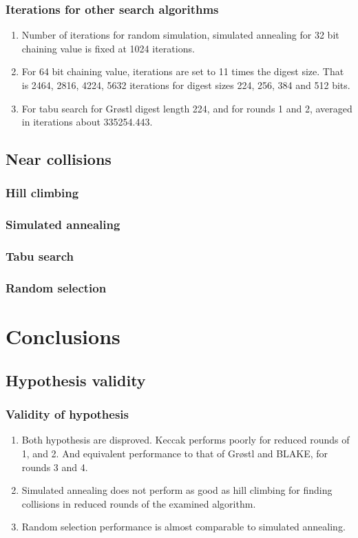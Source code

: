 \documentclass{beamer}
\begin{document}
\begin{frame}
\frametitle{Iterations for other search algorithms}
\begin{enumerate}
\item Number of iterations for random simulation, simulated annealing for 32 bit chaining value is fixed
at 1024 iterations.
\item For 64 bit chaining value, iterations are set to 11 times the digest size. That is 2464, 2816, 4224,
5632 iterations for digest sizes 224, 256, 384 and 512 bits.
\item For tabu search for Gr{\o}stl digest length 224, and for rounds 1 and 2, averaged in iterations 
about 335254.443.
\end{enumerate}
\end{frame}

\subsection{Near collisions}

\begin{frame}
\frametitle{Hill climbing}

\end{frame}

\begin{frame}
\frametitle{Simulated annealing}
\end{frame}

\begin{frame}
\frametitle{Tabu search}
\end{frame}

\begin{frame}
\frametitle{Random selection}
\end{frame}

\section{Conclusions}

\subsection{Hypothesis validity}

\begin{frame}
\frametitle{Validity of hypothesis}
\begin{enumerate}
\item Both hypothesis are disproved. Keccak performs poorly for reduced rounds of 1, and 2. And
equivalent performance to that of Gr{\o}stl and BLAKE, for rounds 3 and 4.
\item Simulated annealing does not perform as good as hill climbing for finding collisions in
reduced rounds of the examined algorithm.
\item Random selection performance is almost comparable to simulated annealing.
\end{enumerate}
\end{frame}
\end{document}
